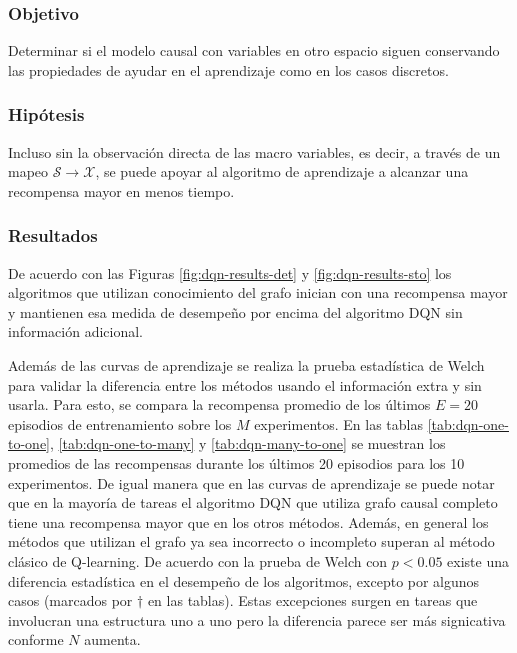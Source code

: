 \subsubsection{Objetivo}

Determinar si el modelo causal con variables  en otro espacio siguen conservando las propiedades
de ayudar en el aprendizaje como en los casos discretos.

\subsubsection{Hipótesis}

Incluso sin la observación directa de las macro variables, es decir, a través de un mapeo $\mathcal{S} \rightarrow \mathcal{X}$, se puede apoyar 
al algoritmo de aprendizaje a alcanzar una recompensa
mayor en menos tiempo.

\subsubsection{Resultados}

De acuerdo con las Figuras \ref{fig:dqn-results-det} y \ref{fig:dqn-results-sto} los algoritmos que utilizan conocimiento del grafo inician con una recompensa mayor y mantienen esa medida de desempeño por encima del algoritmo DQN
sin información adicional. 

Además de las curvas de aprendizaje se realiza la prueba estadística de Welch para validar la diferencia entre los métodos usando el información extra y sin usarla. Para esto, se compara la recompensa promedio de los últimos $E = 20$ episodios
de entrenamiento sobre los $M$ experimentos. 
En las tablas \ref{tab:dqn-one-to-one}, \ref{tab:dqn-one-to-many} y \ref{tab:dqn-many-to-one} se muestran
los promedios de las recompensas durante los últimos 20 episodios para los 10 experimentos.
De igual manera que en las curvas de aprendizaje se puede notar que en la mayoría de tareas el algoritmo DQN que utiliza grafo causal completo tiene una recompensa mayor que en los otros métodos. Además, en general los métodos que utilizan el grafo ya sea incorrecto o incompleto superan al método clásico de Q-learning. De acuerdo con la prueba de Welch con $p < 0.05$ existe una diferencia estadística en el desempeño de los algoritmos, excepto por algunos casos (marcados por $\dagger$ en las tablas). Estas excepciones surgen en tareas que involucran una estructura uno a uno pero la diferencia parece ser más signicativa conforme $N$ aumenta.


